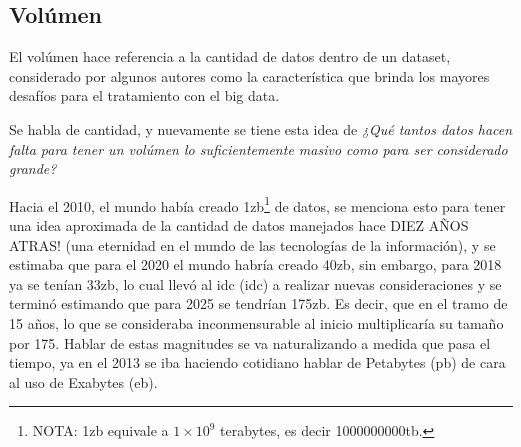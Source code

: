\subsection{Volúmen}
\label{ssec:volumen}

El volúmen hace referencia a la cantidad de datos dentro de un \gls{dataset}\cites{ghasemaghaei2019,
ghasemaghaei2021}, considerado por algunos autores como la característica que
brinda los mayores desafíos para el tratamiento con el big data\cite{che2013}.

Se habla de cantidad, y nuevamente se tiene esta idea de \textit{¿Qué tantos datos hacen
falta para tener un volúmen lo suficientemente masivo como para ser considerado
grande?}

Hacia el 2010, el mundo había creado 1\acrshort{zb}\footnote{NOTA: 1\acrshort{zb} equivale a $1 \times
10^{9}$ terabytes, es decir 1000000000\acrshort{tb}.} de datos, se menciona
esto para tener
una idea aproximada de la cantidad de datos manejados hace DIEZ AÑOS ATRAS! (una
eternidad en el mundo de las tecnologías de la
información),  y se estimaba que para el 2020 el mundo habría creado 40\acrshort{zb}\cite{lam2017}, 
sin embargo, para 2018 ya se tenían 33\acrshort{zb}, lo cual llevó al
\acrlong{idc} (\acrshort{idc}) a 
realizar nuevas consideraciones y se terminó estimando
que para 2025 se tendrían 175\acrshort{zb}\cite{forbes2020}. Es decir,
que en el tramo de 15 años, lo que se consideraba inconmensurable al inicio
multiplicaría su tamaño por 175. Hablar de estas magnitudes se
va naturalizando a medida que pasa el tiempo, ya en el 2013 se iba haciendo
cotidiano hablar de Petabytes (\acrshort{pb}) de cara al uso de
Exabytes (\acrshort{eb})\cite{che2013}. 

